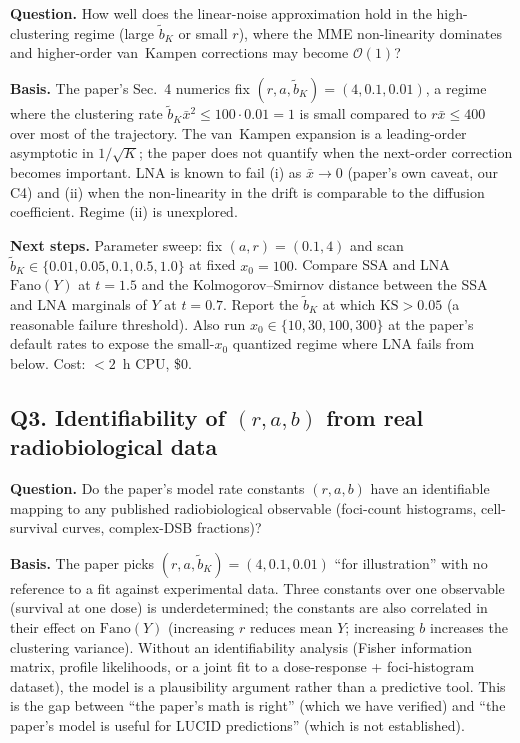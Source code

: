 \textbf{Question.}  How well does the linear-noise approximation hold in the high-clustering regime (large $\tilde b_K$ or small $r$), where the MME non-linearity dominates and higher-order van~Kampen corrections may become $\mathcal O(1)$?

\textbf{Basis.}  The paper's Sec.~4 numerics fix $(r,a,\tilde b_K)=(4,0.1,0.01)$, a regime where the clustering rate $\tilde b_K \bar x^2\le 100\cdot 0.01=1$ is small compared to $r\bar x\le 400$ over most of the trajectory.  The van~Kampen expansion is a leading-order asymptotic in $1/\sqrt K$; the paper does not quantify when the next-order correction becomes important.  LNA is known to fail (i) as $\bar x\to 0$ (paper's own caveat, our C4) and (ii) when the non-linearity in the drift is comparable to the diffusion coefficient.  Regime (ii) is unexplored.

\textbf{Next steps.}  Parameter sweep: fix $(a,r)=(0.1,4)$ and scan $\tilde b_K\in\{0.01,0.05,0.1,0.5,1.0\}$ at fixed $x_0=100$.  Compare SSA and LNA $\mathrm{Fano}(Y)$ at $t=1.5$ and the Kolmogorov--Smirnov distance between the SSA and LNA marginals of $Y$ at $t=0.7$.  Report the $\tilde b_K$ at which $\mathrm{KS}>0.05$ (a reasonable failure threshold).  Also run $x_0\in\{10,30,100,300\}$ at the paper's default rates to expose the small-$x_0$ quantized regime where LNA fails from below.  Cost: $<2$~h CPU, \$0.

\subsection*{Q3.  Identifiability of $(r,a,b)$ from real radiobiological data}

\textbf{Question.}  Do the paper's model rate constants $(r,a,b)$ have an identifiable mapping to any published radiobiological observable (foci-count histograms, cell-survival curves, complex-DSB fractions)?

\textbf{Basis.}  The paper picks $(r,a,\tilde b_K)=(4,0.1,0.01)$ ``for illustration'' with no reference to a fit against experimental data.  Three constants over one observable (survival at one dose) is underdetermined; the constants are also correlated in their effect on $\mathrm{Fano}(Y)$ (increasing $r$ reduces mean $Y$; increasing $b$ increases the clustering variance).  Without an identifiability analysis (Fisher information matrix, profile likelihoods, or a joint fit to a dose-response + foci-histogram dataset), the model is a plausibility argument rather than a predictive tool.  This is the gap between ``the paper's math is right'' (which we have verified) and ``the paper's model is useful for LUCID predictions'' (which is not established).

